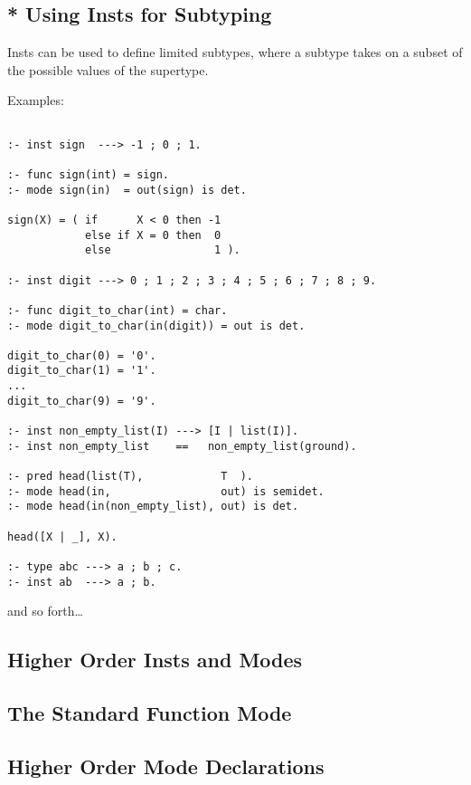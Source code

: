 
\subsection{* Using Insts for Subtyping}

Insts can be used to define limited subtypes, where a subtype
takes on a subset of the possible values of the supertype.

Examples:
\begin{verbatim}

:- inst sign  ---> -1 ; 0 ; 1.

:- func sign(int) = sign.
:- mode sign(in)  = out(sign) is det.

sign(X) = ( if      X < 0 then -1
            else if X = 0 then  0
            else                1 ).

:- inst digit ---> 0 ; 1 ; 2 ; 3 ; 4 ; 5 ; 6 ; 7 ; 8 ; 9.

:- func digit_to_char(int) = char.
:- mode digit_to_char(in(digit)) = out is det.

digit_to_char(0) = '0'.
digit_to_char(1) = '1'.
...
digit_to_char(9) = '9'.

:- inst non_empty_list(I) ---> [I | list(I)].
:- inst non_empty_list    ==   non_empty_list(ground).

:- pred head(list(T),            T  ).
:- mode head(in,                 out) is semidet.
:- mode head(in(non_empty_list), out) is det.

head([X | _], X).

:- type abc ---> a ; b ; c.
:- inst ab  ---> a ; b.
\end{verbatim}
and so forth\ldots


\subsection{Higher Order Insts and Modes}



\subsection{The Standard Function Mode}




\subsection{Higher Order Mode Declarations}

